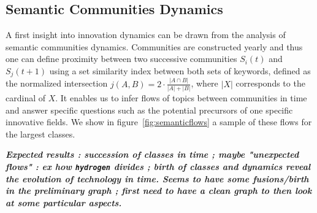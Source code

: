 \documentclass[10pt,A4]{article}
\newcommand{\todo}[1]{\textcolor{red!50!blue}{\textbf{\textit{#1}}}}
\begin{document}
\subsection{Semantic Communities Dynamics \label{subsec:semantic-flows}}


A first insight into innovation dynamics can be drawn from the analysis of semantic communities dynamics. Communities are constructed yearly and thus one can define proximity between two successive communities $S_i(t)$ and $S_j(t+1)$ using a set similarity index between both sets of keywords, defined as the normalized intersection $j(A,B)=2\cdot \frac{\left|A\cap B\right|}{\left|A\right|+\left|B\right|}$, where $\left|X\right|$ corresponds to the cardinal of $X$. It enables us to infer flows of topics between communities in time and answer specific questions such as the potential precursors of one specific innovative fields. We show in figure~\ref{fig:semanticflows} a sample of these flows for the largest classes.


\todo{Expected results : succession of classes in time ; maybe "unexpected flows" : ex how \texttt{hydrogen} divides ; birth of classes and dynamics reveal the evolution of technology in time. Seems to have some fusions/birth in the preliminary graph ; first need to have a clean graph to then look at some particular aspects.}
\end{document}
